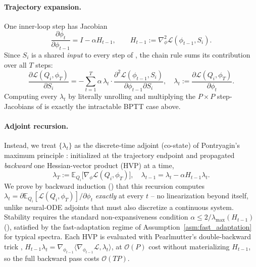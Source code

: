 \paragraph{Trajectory expansion.}
One inner-loop step has Jacobian
\begin{equation}
    \frac{\partial \phi_t}{\partial \phi_{t-1}} = I-\alpha H_{t-1},\qquad H_{t-1}:=\nabla^2_\phi \mathcal{L}(\phi_{t-1}, S_i).
    \label{eq:step_jacobian}
\end{equation}
Since $S_i$ is a shared \emph{input} to every step of , the chain rule sums its contribution over all $T$ steps:
\begin{equation}
    \frac{\partial\mathcal{L}(Q_i,\phi_T)}{\partial S_i} = -\sum_{t=1}^{T}\alpha\,\lambda_t\cdot\frac{\partial^2\mathcal{L}(\phi_{t-1},S_i)}{\partial\phi_{t-1}\partial S_i},\quad
    \lambda_t := \frac{\partial\mathcal{L}(Q_i,\phi_T)}{\partial\phi_t}.
    \label{eq:trajectory_expansion}
\end{equation}
Computing every $\lambda_t$ by literally unrolling and multiplying the $P\times P$ step-Jacobians of  is exactly the intractable BPTT case above.

\paragraph{Adjoint recursion.}
Instead, we treat $\{\lambda_t\}$ as the discrete-time adjoint (co-state) of Pontryagin's maximum principle \citep{pontryagin1962mathematical}: initialized at the trajectory endpoint and propagated \emph{backward} one Hessian-vector product (HVP) at a time,
\begin{equation}
    \lambda_T := \mathbb{E}_{Q_i}\!\big[\nabla_\phi\mathcal{L}(Q_i,\phi_T)\big],\quad
    \lambda_{t-1} = \lambda_t - \alpha H_{t-1}\lambda_t.
    \label{eq:adjoint_recursion}
\end{equation}
We prove by backward induction () that this recursion computes $\lambda_t=\partial\mathbb{E}_{Q_i}[\mathcal{L}(Q_i,\phi_T)]/\partial\phi_t$ \emph{exactly} at every $t$ -- no linearization beyond  itself, unlike neural-ODE adjoints that must also discretize a continuous system. Stability requires the standard non-expansiveness condition $\alpha\le 2/\lambda_{\max}(H_{t-1})$ (), satisfied by the fast-adaptation regime of Assumption~\ref{asm:fast_adaptation} for typical spectra. Each HVP is evaluated with Pearlmutter's double-backward trick \citep{pearlmutter1994fast}, $H_{t-1}\lambda_t=\nabla_{\phi_{t-1}}\langle\nabla_{\phi_{t-1}}\mathcal{L},\lambda_t\rangle$, at $\mathcal{O}(P)$ cost without materializing $H_{t-1}$, so the full backward pass costs $\mathcal{O}(TP)$.

